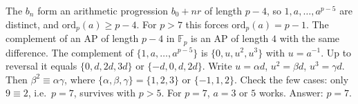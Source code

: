 \documentclass[11pt,a4paper]{article}
\begin{document}
 The $b_n$ form an arithmetic progression $b_0+nr$ of length $p-4$, so $1,a,\dots,a^{p-5}$ are distinct, and $\mathrm{ord}_p(a)\ge p-4$. For $p>7$ this forces $\mathrm{ord}_p(a)=p-1$.
 The complement of an AP of length $p-4$ in $\mathbb F_p$ is an AP of length $4$ with the same difference. The complement of $\{1,a,\dots,a^{p-5}\}$ is $\{0,u,u^2,u^3\}$ with $u=a^{-1}$. Up to reversal it equals $\{0,d,2d,3d\}$ or $\{-d,0,d,2d\}$.
 Write $u=\alpha d$, $u^2=\beta d$, $u^3=\gamma d$. Then $\beta^2\equiv\alpha\gamma$, where $\{\alpha,\beta,\gamma\}=\{1,2,3\}$ or $\{-1,1,2\}$. Check the few cases: only $9\equiv2$, i.e.\ $p=7$, survives with $p>5$. For $p=7$, $a=3$ or $5$ works. Answer: $p=7$.
\end{document}
